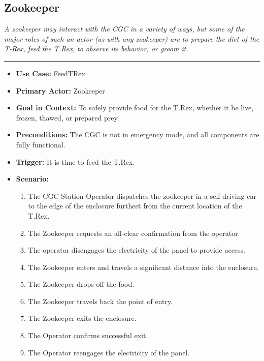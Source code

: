 \documentclass[12pt]{article}
\begin{document}
    \subsection{Zookeeper} \label{zook}
    \textit{A zookeeper may interact with the CGC in a variety of ways, but some of the
    major roles of such an actor (as with any zookeeper) are to prepare the diet of the T-Rex, 
    feed the T.Rex, to observe its behavior, or groom it.}
    \par\noindent\rule{\textwidth}{0.4pt}    
    \begin{itemize}
        \item[]\textbf{Use Case:} 
            FeedTRex                                

        \item[]\textbf{Primary Actor:}
            Zookeeper

        \item[]\textbf{Goal in Context:}
            To safely provide food for the T.Rex, whether it be live, frozen, thawed, or prepared
            prey.

        \item[]\textbf{Preconditions:}
            The CGC is not in emergency mode, and all components are fully functional.

        \item[]\textbf{Trigger:}
            It is time to feed the T.Rex.

        \item[]\textbf{Scenario:}
            \begin{enumerate}
                \item The CGC Station Operator dispatches the zookeeper in a self driving car
                to the edge of the enclosure furthest from the current location of the T.Rex.
                \item The Zookeeper requests an all-clear confirmation from the operator.
                \item The operator disengages the electricity of the panel to provide access.
                \item The Zookeeper enters and travels a significant distance into the enclosure.
                \item The Zookeeper drops off the food.
                \item The Zookeeper travels back the point of entry.
                \item The Zookeeper exits the enclosure.
                \item The Operator confirms successful exit.
                \item The Operator reengages the electricity of the panel. 
            \end{enumerate}


\end{itemize}
\end{document}
